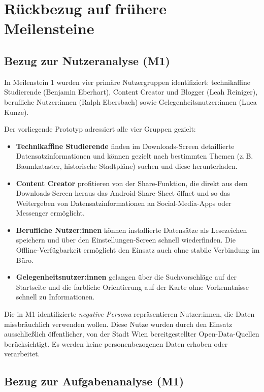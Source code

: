 \section{Rückbezug auf frühere Meilensteine}

\subsection{Bezug zur Nutzeranalyse (M1)}

In Meilenstein 1 wurden vier primäre Nutzergruppen identifiziert:
technikaffine Studierende (Benjamin Eberhart), Content Creator und Blogger (Leah Reiniger),
berufliche Nutzer:innen (Ralph Ebersbach) sowie Gelegenheitsnutzer:innen (Luca Kunze).

Der vorliegende Prototyp adressiert alle vier Gruppen gezielt:
\begin{itemize}
    \item \textbf{Technikaffine Studierende} finden im Downloads-Screen detaillierte Datensatzinformationen und können gezielt nach bestimmten Themen (z.\,B. Baumkataster, historische Stadtpläne) suchen und diese herunterladen.
    \item \textbf{Content Creator} profitieren von der Share-Funktion, die direkt aus dem Downloads-Screen heraus das Android-Share-Sheet öffnet und so das Weitergeben von Datensatzinformationen an Social-Media-Apps oder Messenger ermöglicht.
    \item \textbf{Berufliche Nutzer:innen} können installierte Datensätze als Lesezeichen speichern und über den Einstellungen-Screen schnell wiederfinden. Die Offline-Verfügbarkeit ermöglicht den Einsatz auch ohne stabile Verbindung im Büro.
    \item \textbf{Gelegenheitsnutzer:innen} gelangen über die Suchvorschläge auf der Startseite und die farbliche Orientierung auf der Karte ohne Vorkenntnisse schnell zu Informationen.
\end{itemize}

Die in M1 identifizierte \textit{negative Persona} repräsentieren Nutzer:innen, die Daten missbräuchlich verwenden wollen. Diese Nutze wurden durch den Einsatz ausschließlich öffentlicher, von der Stadt Wien bereitgestellter Open-Data-Quellen berücksichtigt.
Es werden keine personenbezogenen Daten erhoben oder verarbeitet.

\subsection{Bezug zur Aufgabenanalyse (M1)}


